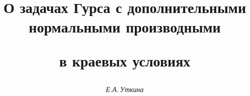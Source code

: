 

 


% 


 


\newcommand{\tts}[1]{} 


 


 




\setcounter{page}{61} 












 


\author{\it Е.А.\,Уткина} 




\title{О задачах Гурса с дополнительными нормальными производными 


в краевых условиях} 


 


\date{} 




\pagestyle{plain} %


 




\maketitle 


\label{begin} 


 


